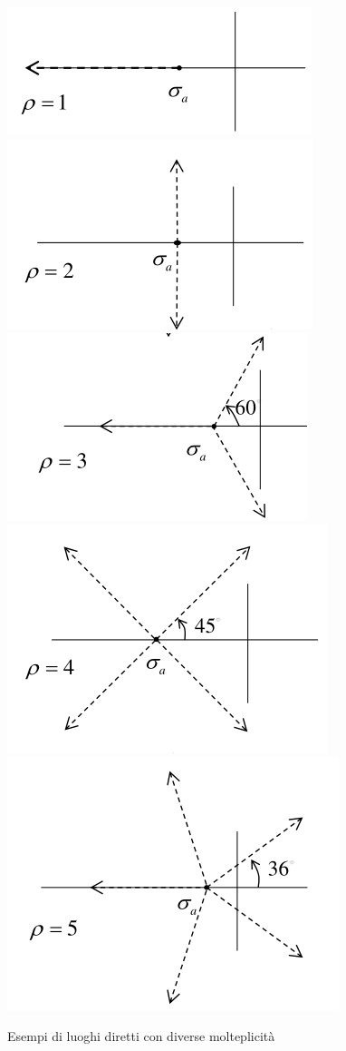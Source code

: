 \begin{figure}[h!]
  \centering
  \includegraphics[width=0.3\linewidth]{./images/luogo_diretto_rho_1.png}
  \includegraphics[width=0.3\linewidth]{./images/luogo_diretto_rho_2.png}
  \includegraphics[width=0.3\linewidth]{./images/luogo_diretto_rho_3.png}
  \includegraphics[width=0.3\linewidth]{./images/luogo_diretto_rho_4.png}
  \includegraphics[width=0.3\linewidth]{./images/luogo_diretto_rho_5.png}
  \caption{Esempi di luoghi diretti con diverse molteplicità}
  \label{fig:luogo_diretto}
\end{figure}


